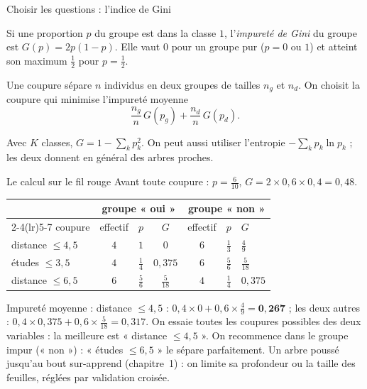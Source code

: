 \documentclass[aspectratio=169,11pt]{beamer}
\begin{document}
\begin{frame}{Choisir les questions : l'indice de Gini}
  \begin{definition}
    Si une proportion $p$ du groupe est dans la classe $1$, l'\emph{impureté de Gini} du groupe est
    $G(p)=2p(1-p)$. Elle vaut $0$ pour un groupe pur ($p=0$ ou $1$) et atteint son maximum $\frac12$ pour $p=\frac12$.
  \end{definition}
  Une coupure sépare $n$ individus en deux groupes de tailles $n_g$ et $n_d$. On choisit la coupure qui minimise l'impureté moyenne
  \[
    \frac{n_g}{n}\,G(p_g)+\frac{n_d}{n}\,G(p_d).
  \]
  \begin{remarque}
    Avec $K$ classes, $G=1-\sum_kp_k^2$. On peut aussi utiliser l'entropie $-\sum_kp_k\ln p_k$ ; les deux donnent en général des arbres proches.
  \end{remarque}
\end{frame}

\begin{frame}{Le calcul sur le fil rouge}
  \small
  Avant toute coupure : $p=\frac6{10}$, $G=2\times0{,}6\times0{,}4=0{,}48$.
  \vskip1mm
  \begin{center}
    \renewcommand{\arraystretch}{1.25}
    \setlength\tabcolsep{5pt}
    \begin{tabular}{lcccccl}
      \toprule
      & \multicolumn{3}{c}{groupe « oui »} & \multicolumn{3}{c}{groupe « non »} \\
      \cmidrule(lr){2-4}\cmidrule(lr){5-7}
      coupure & effectif & $p$ & $G$ & effectif & $p$ & $G$ \\
      \midrule
      distance $\le4{,}5$ & $4$ & $1$ & $0$ & $6$ & $\frac13$ & $\frac49$ \\
      études $\le3{,}5$ & $4$ & $\frac14$ & $0{,}375$ & $6$ & $\frac56$ & $\frac5{18}$ \\
      distance $\le6{,}5$ & $6$ & $\frac56$ & $\frac5{18}$ & $4$ & $\frac14$ & $0{,}375$ \\
      \bottomrule
    \end{tabular}
  \end{center}
  Impureté moyenne : distance $\le4{,}5$ : $0{,}4\times0+0{,}6\times\frac49=\mathbf{0{,}267}$ ; les deux autres : $0{,}4\times0{,}375+0{,}6\times\frac5{18}=0{,}317$.
  On essaie toutes les coupures possibles des deux variables : la meilleure est « distance $\le4{,}5$ ».
  On recommence dans le groupe impur (« non ») : « études $\le6{,}5$ » le sépare parfaitement.
  \vskip1mm
  {\color{cnfGris}Un arbre poussé jusqu'au bout sur-apprend (chapitre~1) : on limite sa profondeur ou la taille des feuilles, réglées par validation croisée.}
\end{frame}
\end{document}
